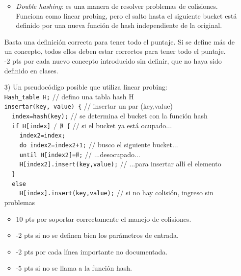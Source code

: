 \documentclass[letter,12pt,oneside]{book}
\theoremstyle{definition}
\begin{document}
\begin{enumerate}
\begin{itemize}
        \item {\em Double hashing}: es una manera de resolver problemas de colisiones. Funciona como linear probing, pero el salto hasta el siguiente bucket está definido por una nueva función de hash independiente de la original.
    \end{itemize}
    Basta una definición correcta para tener todo el puntaje. Si se define más de un concepto, todos ellos deben estar correctos para tener todo el puntaje.\\
    -2 pts por cada nuevo concepto introducido sin definir, que no haya sido definido en clases.
    \item[3)] Un pseudocódigo posible que utiliza linear probing:\\
    
    \texttt{Hash\_table H;}
    \tabto{42ex}// defino una tabla hash H\\
    \texttt{insertar(key, value) \{} 
    \tabto{42ex}// insertar un par (key,value)\\
    $~~~~~$\texttt{index=hash(key);} 
    \tabto{42ex}// se determina el bucket con la función hash\\
    $~~~~~$\texttt{if H[index]$\neq\emptyset$ \{} 
    \tabto{42ex}// si el bucket ya está ocupado...\\
    $~~~~~~~~~~$\texttt{index2=index;} 
    \tabto{42ex}\\
    $~~~~~~~~~~$\texttt{do index2=index2+1;} 
    \tabto{42ex}// busco el siguiente bucket...\\
    $~~~~~~~~~~$\texttt{until H[index2]=$\emptyset$;} 
    \tabto{42ex}// ...desocupado...\\
    $~~~~~~~~~~$\texttt{H[index2].insert(key,value);}
    \tabto{42ex}// ...para insertar allí el elemento\\
    $~~~~~$\texttt{\}}\\
    $~~~~~$\texttt{else}\\
    $~~~~~~~~~~$\texttt{H[index].insert(key,value);} 
    \tabto{42ex}// si no hay colisión, ingreso sin problemas\\
    \begin{itemize}
        \item 10 pts por soportar correctamente el manejo de colisiones.
        \item -2 pts si no se definen bien los parámetros de entrada.
        \item -2 pts por cada línea importante no documentada.
        \item -5 pts si no se llama a la función hash.
    \end{itemize}
\end{enumerate}
\end{document}
